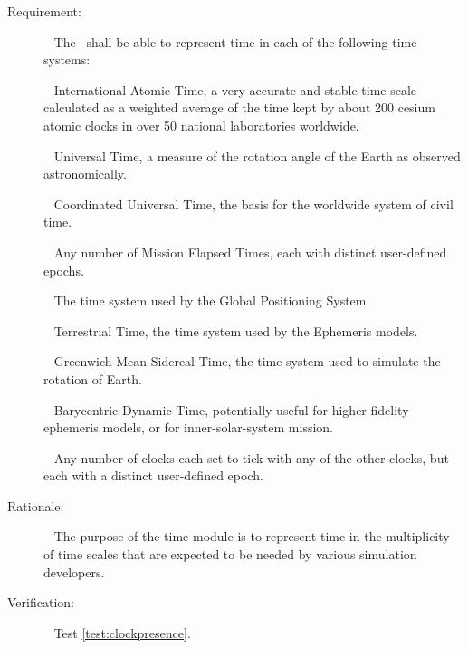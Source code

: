 \label{reqt:datatimerepresentation}
\begin{description}
  \item[Requirement:]\ \newline
    The \timeDesc\ shall be able to represent time in
    each of the following time systems:

    \label{reqt:data_time_rep_TAI}
      \ \newline
      International Atomic Time,
      a very accurate and stable time scale calculated as a weighted 
      average of the time kept by about 200 cesium atomic clocks in 
      over 50 national laboratories worldwide.

    \label{reqt:data_time_rep_UT1}
      \ \newline
      Universal Time, a measure of the rotation angle of the Earth 
      as observed astronomically.

    \label{reqt:data_time_rep_UTC}
      \ \newline
      Coordinated Universal Time, the basis for the worldwide system 
      of civil time.

    \label{reqt:data_time_rep_MET}
      \ \newline
      Any number of Mission Elapsed Times, each with distinct user-defined 
      epochs.

    \label{reqt:data_time_rep_GPS}
      \ \newline
      The time system used by the Global Positioning System.
		
    \label{reqt:data_time_rep_TT}
      \ \newline
      Terrestrial Time, the time system used by the Ephemeris models.
		
    \label{reqt:data_time_rep_GMST}
      \ \newline
      Greenwich Mean Sidereal Time, the time system used to simulate the
			rotation of Earth.
		
    \label{reqt:data_time_rep_TDB}
      \ \newline
      Barycentric Dynamic Time, potentially useful for higher fidelity ephemeris
			models, or for inner-solar-system mission.
		
    \label{reqt:data_time_rep_UDE}
      \ \newline
      Any number of clocks each set to tick with any of the other clocks, but 
      each with a distinct user-defined epoch.

			
		

  \item[Rationale:]\ \newline
    The purpose of the time module is to represent 
    time in the multiplicity of time scales that are expected to be 
    needed by various simulation developers.

  \item[Verification:]\ \newline
    Test \vref{test:clockpresence}.
\end{description}

